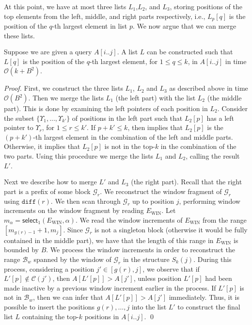 \documentclass[runningheads]{llncs}
\def\selop{\textsf{select}}
\newcommand{\Oh}{\mathcal{O}}
\begin{document}
At this point, we have at most three lists $L_1$,$L_2$, and $L_3$,
storing positions of the top elements from the left, middle, and right
parts respectively, i.e., $L_p[q]$ is the position of the $q$-th
largest element in list $p$. We now argue that we can merge these
lists.

\begin{lemma}
Suppose we are given a query $A[i..j]$.  A list $L$ can be constructed
such that $L[q]$ is the position of the $q$-th largest element, for $1
\le q \le k$, in $A[i..j]$ in time $\Oh(k + B^2)$.
\end{lemma}

\begin{proof}
First, we construct the three lists $L_1$, $L_2$ and $L_3$ as
described above in time $\Oh(B^2)$.  Then we merge the lists $L_1$
(the left part) with the list $L_2$ (the middle part).  This is done
by examining the left pointers of each position in $L_2$.  Consider
the subset $\{\Upsilon_1, ..., \Upsilon_{k'}\}$ of positions in the
left part such that $L_2[p]$ has a left pointer to $\Upsilon_{r}$, for
$1 \le r \le k'$.  If $p + k' \le k$, then implies that $L_2[p]$ is
the $(p + k')$-th largest element in the combination of the left and
middle parts.  Otherwise, it implies that $L_2[p]$ is not in the
top-$k$ in the combination of the two parts.  Using this procedure we
merge the lists $L_1$ and $L_2$, calling the result $L'$.

Next we describe how to merge $L'$ and $L_3$ (the right part).  Recall
that the right part is a prefix of some block $\mathcal{G}_{r}$.  We
reconstruct the window fragment of $\mathcal{G}_{r}$ using
$\texttt{diff}(r)$.  We then scan through $\mathcal{G}_{r}$ up to
position $j$, performing window increments on the window fragment by
reading $E_{\text{WIN}}$.  Let $m_\alpha =
\selop_1(E_{\text{WIN}},\alpha)$.  We read the window increments of
$E_{\text{WIN}}$ from the range $[m_{g(r)-1}+1,m_{j}]$.  Since
$\mathcal{G}_{r}$ is not a singleton block (otherwise it would be
fully contained in the middle part), we have that the length of this
range in $E_\text{WIN}$ is bounded by $B$.  We process the window
increments in order to reconstruct the range $\mathcal{B}_w$ spanned
by the window of $\mathcal{G}_r$ in the structure $S_k(j)$.  During
this process, considering a position $j' \in [g(r),j]$, we observe
that if $L'[p] \not \in \mathcal{C}(j')$, then $A[L'[p]] > A[j']$,
unless position $L'[p]$ had been made inactive by a previous window
increment earlier in the process.  If $L'[p]$ is not in
$\mathcal{B}_w$, then we can infer that $A[L'[p]] > A[j']$
immediately.  Thus, it is possible to insert the positions
$g(r),\ldots,j$ into the list $L'$ to construct the final list $L$
containing the top-$k$ positions in $A[i..j]$.  \qed

\end{proof}
\end{document}
